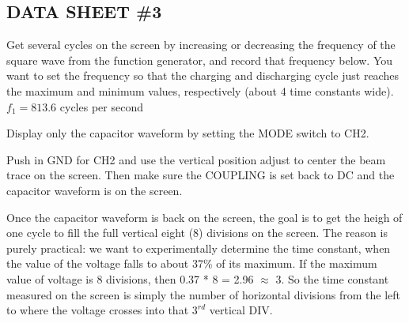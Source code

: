 \subsection{DATA SHEET \#3}
		\item Get several cycles on the screen by increasing or decreasing the frequency of the square wave from the function generator, and record that frequency below.  You want to set the frequency so that the charging and discharging cycle just reaches the maximum and minimum values, respectively (about 4 time constants wide).\\
		
		$f_1 = 813.6$  cycles per second\\
		
		\item Display only the capacitor waveform by setting the MODE switch to CH2.\\
		
		\item Push in GND for CH2 and use the vertical position adjust to center the beam trace on the screen.  Then make sure the COUPLING is set back to DC and the capacitor waveform is on the screen.\\
		
		\item Once the capacitor waveform is back on the screen, the goal is to get the heigh of one cycle to fill the full vertical eight (8) divisions on the screen.  The reason is purely practical:  we want to experimentally determine the time constant,  when the value of the voltage falls to about 37\% of its maximum.  If the maximum value of voltage is 8 divisions, then 0.37 * 8 = 2.96 $\approx$ 3.  So the time constant measured on the screen is simply the number of horizontal divisions from the left to where the voltage crosses into that $3^{rd}$ vertical DIV.
		

